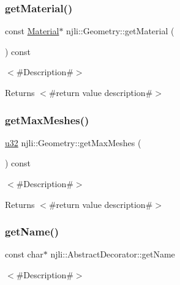 \subsubsection{\texorpdfstring{get\+Material()}{getMaterial()}\hspace{0.1cm}{\footnotesize\ttfamily [2/2]}}
{\footnotesize\ttfamily const \mbox{\hyperlink{classnjli_1_1_material}{Material}}$\ast$ njli\+::\+Geometry\+::get\+Material (\begin{DoxyParamCaption}{ }\end{DoxyParamCaption}) const}

$<$\#\+Description\#$>$

\begin{DoxyReturn}{Returns}
$<$\#return value description\#$>$ 
\end{DoxyReturn}
\mbox{\label{classnjli_1_1_geometry_a99e87d031c95a3a4e73f2e1d68f7e977}} 
\subsubsection{\texorpdfstring{get\+Max\+Meshes()}{getMaxMeshes()}}
{\footnotesize\ttfamily \mbox{\hyperlink{_util_8h_a10e94b422ef0c20dcdec20d31a1f5049}{u32}} njli\+::\+Geometry\+::get\+Max\+Meshes (\begin{DoxyParamCaption}{ }\end{DoxyParamCaption}) const}

$<$\#\+Description\#$>$

\begin{DoxyReturn}{Returns}
$<$\#return value description\#$>$ 
\end{DoxyReturn}
\mbox{\label{classnjli_1_1_geometry_ad41266885be835f3ee602311e20877a4}} 
\subsubsection{\texorpdfstring{get\+Name()}{getName()}}
{\footnotesize\ttfamily const char$\ast$ njli\+::\+Abstract\+Decorator\+::get\+Name}

$<$\#\+Description\#$>$

